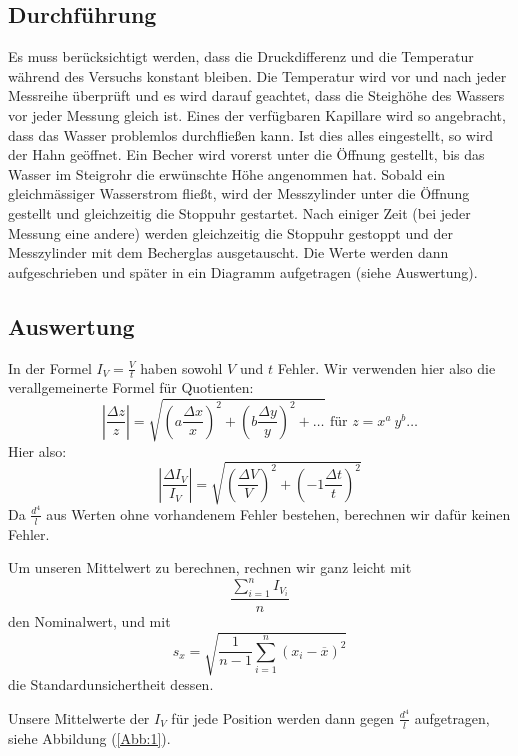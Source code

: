 \documentclass[11pt,a4paper]{article}
\begin{document}
\pagebreak

\subsection{Durchführung}

Es muss berücksichtigt werden, dass die Druckdifferenz und die Temperatur während des Versuchs konstant bleiben. Die Temperatur wird vor und nach jeder Messreihe überprüft und es wird darauf geachtet, dass die Steighöhe des Wassers vor jeder Messung gleich ist. Eines der verfügbaren Kapillare wird so angebracht, dass das Wasser problemlos durchflie\ss en kann. Ist dies alles eingestellt, so wird der Hahn geöffnet. Ein Becher wird vorerst unter die Öffnung gestellt, bis das Wasser im Steigrohr die erwünschte Höhe angenommen hat. Sobald ein gleichmässiger Wasserstrom fließt, wird der Messzylinder unter die Öffnung gestellt und gleichzeitig die Stoppuhr gestartet. Nach einiger Zeit (bei jeder Messung eine andere) werden gleichzeitig die Stoppuhr gestoppt und der Messzylinder mit dem Becherglas ausgetauscht. Die Werte werden dann aufgeschrieben und sp\"ater in ein Diagramm aufgetragen (siehe Auswertung).

\subsection{Auswertung}

In der Formel $I_V=\frac{V}{t}$ haben sowohl $V$ und $t$ Fehler. Wir verwenden hier also die verallgemeinerte Formel f\"ur Quotienten:
$$
\left\vert\frac{\Delta z}{z}\right\vert=\sqrt{\left(a\frac{\Delta x}{x}\right)^2+\left(b\frac{\Delta y}{y}\right)^2+\ldots}\textrm{ f\"ur }z=x^a\ y^b\ldots
$$
Hier also:
$$
\left\vert\frac{\Delta I_V}{I_V}\right\vert=\sqrt{\left(\frac{\Delta V}{V}\right)^2+\left(-1\frac{\Delta t}{t}\right)^2}
$$
Da $\frac{d^4}{l}$ aus Werten ohne vorhandenem Fehler bestehen, berechnen wir daf\"ur keinen Fehler.

Um unseren Mittelwert zu berechnen, rechnen wir ganz leicht mit 
\begin{equation}
\frac{\sum_{i=1}^n I_{V_i}}{n}\label{mean}
\end{equation}
den Nominalwert, und mit
\begin{equation}
s_x=\sqrt{\frac{1}{n-1}\sum_{i=1}^n(x_i-\overline{x})^2}\label{meanstd}
\end{equation}
die Standardunsichertheit dessen.

Unsere Mittelwerte der $I_V$ f\"ur jede Position werden dann gegen $\frac{d^4}{l}$ aufgetragen, siehe Abbildung (\ref{Abb:1}).
\end{document}
